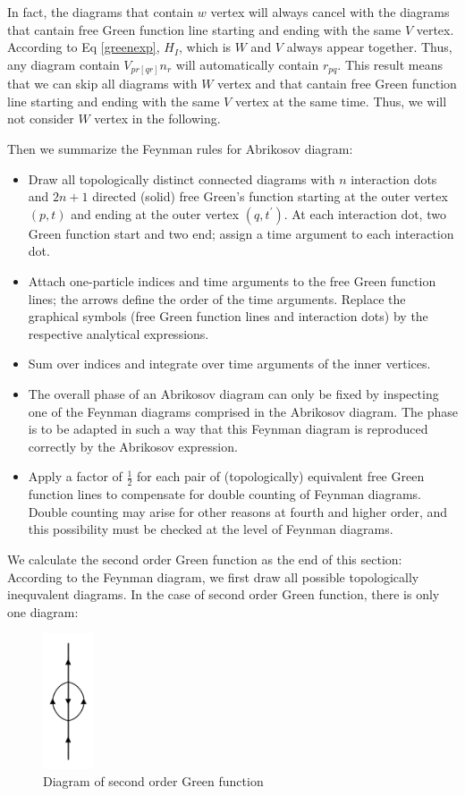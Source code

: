 In fact, the diagrams that contain $w$ vertex will always cancel with the diagrams that cantain free Green function line starting and ending with the same $V$ vertex.
According to Eq \ref{greenexp}, $H_I$, which is $W$ and $V$ always appear together.
Thus, any diagram contain $V_{pr[qr]}n_r$ will automatically contain $r_{pq}$.
This result means that we can skip all diagrams with $W$ vertex and that cantain free Green function line starting and ending with the same $V$ vertex at the same time.
Thus, we will not consider $W$ vertex in the following.

Then we summarize the Feynman rules for Abrikosov diagram:
\begin{itemize}
	\item Draw all topologically distinct connected diagrams with $n$ interaction dots and $2n + 1$ directed (solid) free Green’s function starting at the outer vertex $(p, t)$ and ending at the outer vertex $(q, t^{\prime})$.
		At each interaction dot, two Green function start and two end; assign a time argument to each interaction dot.
	\item Attach one-particle indices and time arguments to the free Green function lines; the arrows define the order of the time arguments. Replace the graphical symbols (free Green function lines and interaction dots) by the respective analytical expressions.
	\item Sum over indices and integrate over time arguments of the inner vertices.
	\item The overall phase of an Abrikosov diagram can only be fixed by inspecting one of the Feynman diagrams comprised in the Abrikosov diagram.
		The phase is to be adapted in such a way that this Feynman diagram is reproduced correctly by the Abrikosov expression.
	\item Apply a factor of $\frac{1}{2}$ for each pair of (topologically) equivalent free Green function lines to compensate for double counting of Feynman diagrams. Double counting may arise for other reasons at fourth and higher order, and this possibility must be checked at the level of Feynman diagrams.
\end{itemize}

We calculate the second order Green function as the end of this section:
According to the Feynman diagram, we first draw all possible topologically inequvalent diagrams.
In the case of second order Green function, there is only one diagram:
\begin{figure}[h]
	\centering
	\includegraphics[height=4cm]{figures/order2.png}
	\caption{Diagram of second order Green function}
\end{figure}

